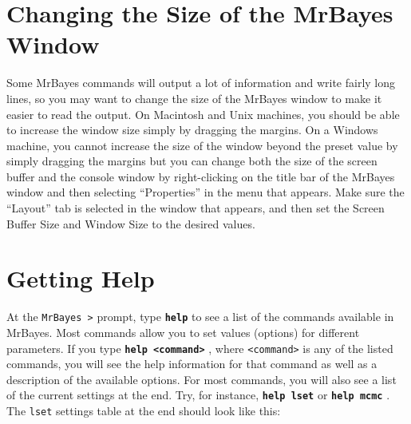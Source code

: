 \documentclass[12pt]{book}
\newcommand{\ttt}[1]{\texttt{#1} }
\newcommand{\tb}[1]{\texttt{\textbf{#1}} }
\begin{document}
\section{Changing the Size of the MrBayes Window}

Some MrBayes commands will output a lot of information and write fairly long lines, so
you may want to change the size of the MrBayes window to make it easier to read the
output. On Macintosh and Unix machines, you should be able to increase the window
size simply by dragging the margins. On a Windows machine, you cannot increase the
size of the window beyond the preset value by simply dragging the margins but you can
change both the size of the screen buffer and the
console window by right-clicking on the title bar of the MrBayes window and then
selecting ``Properties'' in the menu that appears. Make sure the ``Layout'' tab is selected in
the window that appears, and then set the Screen Buffer Size and Window Size to the
desired values.

\section{Getting Help}
\label{gettingHelp}

At the \ttt{MrBayes >} prompt, type \tb{help} to see a list of the commands available in
MrBayes. Most commands allow you to set values (options) for different parameters. If
you type \tb{help <command>}, where \ttt{<command>} is any of the listed commands, you
will see the help information for that command as well as a description of the available
options. For most commands, you will also see a list of the current settings at the end.
Try, for instance, \tb{help lset} or \tb{help mcmc}. The \ttt{lset} settings table at the end
should look like this:
\end{document}
